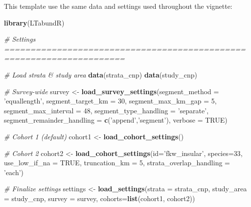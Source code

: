 \documentclass[
]{book}
\newenvironment{Shaded}{\begin{snugshade}}{\end{snugshade}}
\newcommand{\CommentTok}[1]{\textcolor[rgb]{0.56,0.35,0.01}{\textit{#1}}}
\newcommand{\DataTypeTok}[1]{\textcolor[rgb]{0.13,0.29,0.53}{#1}}
\newcommand{\DecValTok}[1]{\textcolor[rgb]{0.00,0.00,0.81}{#1}}
\newcommand{\KeywordTok}[1]{\textcolor[rgb]{0.13,0.29,0.53}{\textbf{#1}}}
\newcommand{\NormalTok}[1]{#1}
\newcommand{\OtherTok}[1]{\textcolor[rgb]{0.56,0.35,0.01}{#1}}
\newcommand{\StringTok}[1]{\textcolor[rgb]{0.31,0.60,0.02}{#1}}
\begin{document}
This template use the same data and settings used throughout the vignette:

\begin{Shaded}
\begin{Highlighting}[]
\KeywordTok{library}\NormalTok{(LTabundR)}

\CommentTok{# Settings =====================================================================}

\CommentTok{# Load strata & study area}
\KeywordTok{data}\NormalTok{(strata_cnp)}
\KeywordTok{data}\NormalTok{(study_cnp)}

\CommentTok{# Survey-wide}
\NormalTok{survey <-}\StringTok{ }
\StringTok{  }\KeywordTok{load_survey_settings}\NormalTok{(}\DataTypeTok{segment_method =} \StringTok{'equallength'}\NormalTok{,}
                       \DataTypeTok{segment_target_km =} \DecValTok{30}\NormalTok{,}
                       \DataTypeTok{segment_max_km_gap =} \DecValTok{5}\NormalTok{,}
                       \DataTypeTok{segment_max_interval =} \DecValTok{48}\NormalTok{,}
                       \DataTypeTok{segment_type_handling =} \StringTok{'separate'}\NormalTok{,}
                       \DataTypeTok{segment_remainder_handling =} \KeywordTok{c}\NormalTok{(}\StringTok{'append'}\NormalTok{,}\StringTok{'segment'}\NormalTok{),}
                       \DataTypeTok{verbose =} \OtherTok{TRUE}\NormalTok{)}

\CommentTok{# Cohort 1 (default)}
\NormalTok{cohort1 <-}\StringTok{ }\KeywordTok{load_cohort_settings}\NormalTok{()}

\CommentTok{# Cohort 2}
\NormalTok{cohort2 <-}\StringTok{ }
\StringTok{  }\KeywordTok{load_cohort_settings}\NormalTok{(}\DataTypeTok{id=}\StringTok{'fkw_insular'}\NormalTok{,}
                       \DataTypeTok{species=}\DecValTok{33}\NormalTok{,}
                       \DataTypeTok{use_low_if_na =} \OtherTok{TRUE}\NormalTok{,}
                       \DataTypeTok{truncation_km =} \DecValTok{5}\NormalTok{,}
                       \DataTypeTok{strata_overlap_handling =} \StringTok{'each'}\NormalTok{)}

\CommentTok{# Finalize settings}
\NormalTok{settings <-}\StringTok{ }\KeywordTok{load_settings}\NormalTok{(}\DataTypeTok{strata =}\NormalTok{ strata_cnp,}
                          \DataTypeTok{study_area =}\NormalTok{ study_cnp,}
                          \DataTypeTok{survey =}\NormalTok{ survey,}
                          \DataTypeTok{cohorts=}\KeywordTok{list}\NormalTok{(cohort1,}
\NormalTok{                                       cohort2))}



\end{Highlighting}
\end{Shaded}
\end{document}

